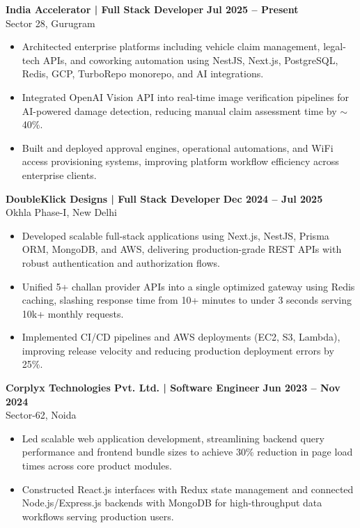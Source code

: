 \documentclass[a4paper,9pt]{article}
\begin{document}
{\footnotesize

\textbf{India Accelerator | Full Stack Developer}
\hfill \textbf{Jul 2025 -- Present} \\
Sector 28, Gurugram

\begin{itemize}
\item Architected enterprise platforms including vehicle claim management, legal-tech APIs, and coworking automation using NestJS, Next.js, PostgreSQL, Redis, GCP, TurboRepo monorepo, and AI integrations.
\item Integrated OpenAI Vision API into real-time image verification pipelines for AI-powered damage detection, reducing manual claim assessment time by $\sim$40\%.
\item Built and deployed approval engines, operational automations, and WiFi access provisioning systems, improving platform workflow efficiency across enterprise clients.
\end{itemize}

\vspace{0.5mm}

\textbf{DoubleKlick Designs | Full Stack Developer}
\hfill \textbf{Dec 2024 -- Jul 2025} \\
Okhla Phase-I, New Delhi

\begin{itemize}
\item Developed scalable full-stack applications using Next.js, NestJS, Prisma ORM, MongoDB, and AWS, delivering production-grade REST APIs with robust authentication and authorization flows.
\item Unified 5+ challan provider APIs into a single optimized gateway using Redis caching, slashing response time from 10+ minutes to under 3 seconds serving 10k+ monthly requests.
\item Implemented CI/CD pipelines and AWS deployments (EC2, S3, Lambda), improving release velocity and reducing production deployment errors by 25\%.
\end{itemize}

\vspace{0.5mm}

\textbf{Corplyx Technologies Pvt. Ltd. | Software Engineer}
\hfill \textbf{Jun 2023 -- Nov 2024} \\
Sector-62, Noida

\begin{itemize}
\item Led scalable web application development, streamlining backend query performance and frontend bundle sizes to achieve 30\% reduction in page load times across core product modules.
\item Constructed React.js interfaces with Redux state management and connected Node.js/Express.js backends with MongoDB for high-throughput data workflows serving production users.
\end{itemize}

}
\end{document}
